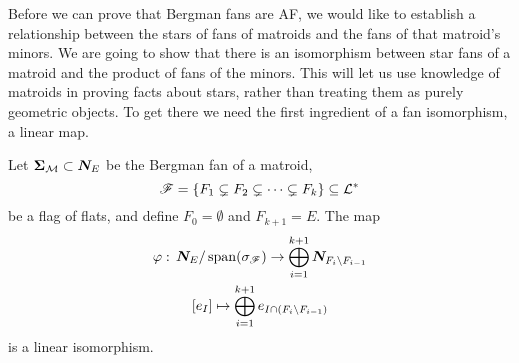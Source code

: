 \documentclass[12pt,oneside]{../../sfsuthesis}
\begin{document}
Before we can prove that Bergman fans are AF, we would like to establish a relationship between the stars of fans of matroids and the fans of that matroid's minors.
We are going to show that there is an isomorphism between star fans of a matroid and the product of fans of the minors.
This will let us use knowledge of matroids in proving facts about stars, rather than treating them as purely geometric objects.
To get there we need the first ingredient of a fan isomorphism, a linear map.
\begin{lemma}\th\label{thm:quotientBijection}
    Let \( {\bm{\Sigma}}_{\mathcal{M}} \subset \bm{N}_E \) be the Bergman fan of a matroid,
    \[
        \mathscr{F} = \{ F_1 \subsetneq F_2 \subsetneq \cdots \subsetneq F_k \} \subseteq \mathcal{L}^\ast
    \]
    be a flag of flats, and define \( F_0 = \emptyset \) and \( F_{k+1} = E \).
    The map
    \begin{gather*}
        \varphi:\, \bm{N}_E / \operatorname{span}(\sigma_{\mathscr{F}}) \to \bigoplus_{i=1}^{k+1} \bm{N}_{F_i \setminus F_{i-1}} \\
        [e_I] \mapsto \bigoplus_{i=1}^{k+1} e_{I \cap (F_i \setminus F_{i-1})}
    \end{gather*}
    is a linear isomorphism.
\end{lemma}
\end{document}
